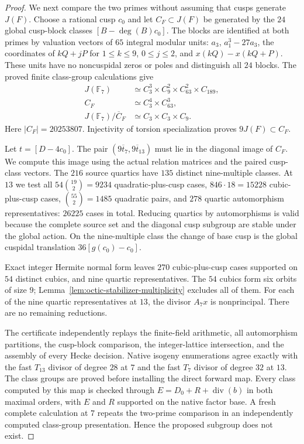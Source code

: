 \begin{proof}
We next compare the two primes without assuming that cusps generate
$J(F)$. Choose a rational cusp $c_0$ and let $C_F\subset J(F)$
be generated by the $24$ global cusp-block classes
$[B-\deg(B)c_0]$.
The blocks are identified at both primes by valuation vectors
of $65$ integral modular units: $a_3$, $a_1^3-27a_3$,
the coordinates of $kQ+jP$ for $1\leq k\leq9$,
$0\leq j\leq2$, and $x(kQ)-x(kQ+P)$.
These units have no noncuspidal zeros or poles and distinguish
all $24$ blocks. The proved finite class-group calculations give
\[
 \begin{split}
 J(\mathbb F_7)&\simeq C_3^3\times C_9^2
                  \times C_{63}^2\times C_{189},\\
 C_F&\simeq C_3^4\times C_{63}^3,\\
 J(\mathbb F_7)/\overline C_F&\simeq C_3\times C_3\times C_9.
 \end{split}
\]
Here $|C_F|=20253807$. Injectivity of torsion specialization
proves $9J(F)\subset C_F$.

Let $t=[D-4c_0]$.
The pair $(9\overline t_7,9\overline t_{13})$ must lie in the
diagonal image of $C_F$. We compute this image using the actual
relation matrices and the paired cusp-class vectors.
The $216$ source quartics have $135$ distinct nine-multiple classes.
At $13$ we test all $54\binom{19}{2}=9234$ quadratic-plus-cusp
cases, $846\cdot18=15228$ cubic-plus-cusp cases,
$\binom{55}{2}=1485$ quadratic pairs, and $278$ quartic
automorphism representatives: $26225$ cases in total.
Reducing quartics by automorphisms is valid because the complete
source set and the diagonal cusp subgroup are stable under the
global action. On the nine-multiple class the change of base cusp
is the global cuspidal translation $36[g(c_0)-c_0]$.

Exact integer Hermite normal form leaves $270$ cubic-plus-cusp
cases supported on $54$ distinct cubics, and nine quartic
representatives. The $54$ cubics form six orbits of size $9$;
Lemma~\ref{lem:octic-stabilizer-multiplicity} excludes all of them.
For each of the nine quartic representatives at $13$, the divisor
$A_7x$ is nonprincipal. There are no remaining reductions.

The certificate independently replays the finite-field arithmetic,
all automorphism partitions, the cusp-block comparison, the
integer-lattice intersection, and the assembly of every Hecke
decision. Native isogeny enumerations agree exactly with the
fast $T_{13}$ divisor of degree $28$ at $7$ and the fast $T_7$
divisor of degree $32$ at $13$.
The class groups are proved before installing the direct forward
map. Every class computed by this map is checked through
$E=D_0+R+\operatorname{div}(b)$ in both maximal orders, with
$E$ and $R$ supported on the native factor base.
A fresh complete calculation at $7$ repeats the two-prime
comparison in an independently computed class-group presentation.
Hence the proposed subgroup does not exist.
\end{proof}
